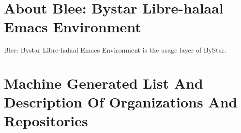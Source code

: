 \begin{comment}
*  [[elisp:(org-cycle)][| ]] [[elisp:(org-show-subtree)][|=]] [[elisp:(show-children 10)][|V]] [[elisp:(bx:orgm:indirectBufOther)][|>]] [[elisp:(bx:orgm:indirectBufMain)][|I]] [[elisp:(blee:ppmm:org-mode-toggle)][|N]] [[elisp:(org-top-overview)][|O]] [[elisp:(progn (org-shifttab) (org-content))][|C]] [[elisp:(delete-other-windows)][|1]]  /Section/   About Blee: Bystar Libre-halaal Emacs Environment ::  [[elisp:(org-cycle)][| ]]
\end{comment}

\section{About Blee: Bystar Libre-halaal Emacs Environment}


Blee: Bystar Libre-halaal Emacs Environment is the usage layer of ByStar.


\begin{comment}
*  [[elisp:(org-cycle)][| ]]  [[elisp:(blee:ppmm:org-mode-toggle)][Nat]] [[elisp:(beginning-of-buffer)][Top]] [[elisp:(delete-other-windows)][(1)]] || /DBLOCK: Table Of Contents/  ::  [[elisp:(org-cycle)][| ]]
\end{comment}

\tableofcontents




\begin{comment}
*  [[elisp:(org-cycle)][| ]] [[elisp:(org-show-subtree)][|=]] [[elisp:(show-children 10)][|V]] [[elisp:(bx:orgm:indirectBufOther)][|>]] [[elisp:(bx:orgm:indirectBufMain)][|I]] [[elisp:(blee:ppmm:org-mode-toggle)][|N]] [[elisp:(org-top-overview)][|O]] [[elisp:(progn (org-shifttab) (org-content))][|C]] [[elisp:(delete-other-windows)][|1]]  /Section/   Machine Generated List And Description Of Organizations And Repositories ::  [[elisp:(org-cycle)][| ]]
\end{comment}

\section{Machine Generated List And Description Of Organizations And Repositories}

